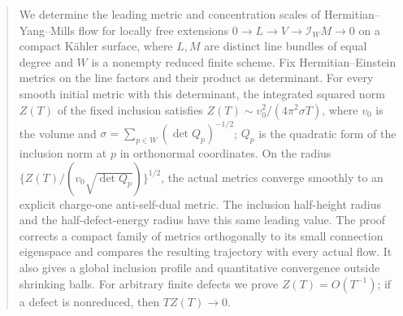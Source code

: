 \begin{abstract}
We determine the leading metric and concentration scales of
Hermitian--Yang--Mills flow for locally free extensions
\(0\to L\to V\to\mathcal I_WM\to0\) on a compact Kähler
surface, where \(L,M\) are distinct line bundles of equal
degree and \(W\) is a nonempty reduced finite scheme.
Fix Hermitian--Einstein metrics on the line factors and
their product as determinant. For every smooth initial
metric with this determinant, the integrated squared norm
\(Z(T)\) of the fixed inclusion satisfies
\(Z(T)\sim v_0^2/(4\pi^2\sigma T)\), where \(v_0\) is
the volume and
\(\sigma=\sum_{p\in W}(\det Q_p)^{-1/2}\);
\(Q_p\) is the quadratic form of the inclusion norm
at \(p\) in orthonormal coordinates.
On the radius
\(\{Z(T)/(v_0\sqrt{\det Q_p})\}^{1/2}\), the actual
metrics converge smoothly to an explicit charge-one
anti-self-dual metric. The inclusion half-height radius
and the half-defect-energy radius have this same leading
value. The proof corrects a compact family of metrics
orthogonally to its small connection eigenspace and
compares the resulting trajectory with every actual
flow. It also gives a global inclusion profile and
quantitative convergence outside shrinking balls.
For arbitrary finite defects we prove \(Z(T)=O(T^{-1})\);
if a defect is nonreduced, then \(TZ(T)\to0\).
\end{abstract}
